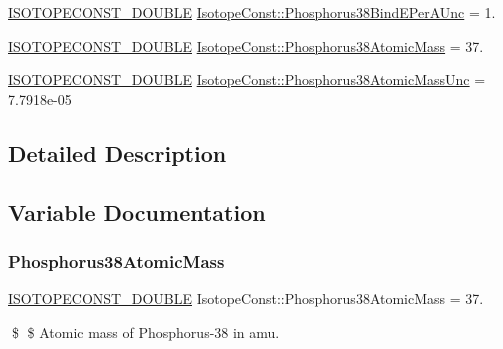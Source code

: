 \begin{DoxyCompactItemize}
\mbox{\hyperlink{group___isotope_const-_macros_ga8f45a7272ce02c0b4c65c44636ed719a}{I\+S\+O\+T\+O\+P\+E\+C\+O\+N\+S\+T\+\_\+\+D\+O\+U\+B\+LE}} \mbox{\hyperlink{group___isotope_const-_phosphorus-_p38_ga1e56cc3b4659a030aa91b6d56e541f2d}{Isotope\+Const\+::\+Phosphorus38\+Bind\+E\+Per\+A\+Unc}} = 1.
\item 
\mbox{\hyperlink{group___isotope_const-_macros_ga8f45a7272ce02c0b4c65c44636ed719a}{I\+S\+O\+T\+O\+P\+E\+C\+O\+N\+S\+T\+\_\+\+D\+O\+U\+B\+LE}} \mbox{\hyperlink{group___isotope_const-_phosphorus-_p38_gaf8de0927096c3c22b1b772d3cbffcc89}{Isotope\+Const\+::\+Phosphorus38\+Atomic\+Mass}} = 37.
\item 
\mbox{\hyperlink{group___isotope_const-_macros_ga8f45a7272ce02c0b4c65c44636ed719a}{I\+S\+O\+T\+O\+P\+E\+C\+O\+N\+S\+T\+\_\+\+D\+O\+U\+B\+LE}} \mbox{\hyperlink{group___isotope_const-_phosphorus-_p38_ga5da9348521f2e1e24bd2f993eeeab9fb}{Isotope\+Const\+::\+Phosphorus38\+Atomic\+Mass\+Unc}} = 7.\+7918e-\/05
\end{DoxyCompactItemize}


\subsection{Detailed Description}


\subsection{Variable Documentation}
\mbox{\label{group___isotope_const-_phosphorus-_p38_gaf8de0927096c3c22b1b772d3cbffcc89}} 
\subsubsection{\texorpdfstring{Phosphorus38\+Atomic\+Mass}{Phosphorus38AtomicMass}}
{\footnotesize\ttfamily \mbox{\hyperlink{group___isotope_const-_macros_ga8f45a7272ce02c0b4c65c44636ed719a}{I\+S\+O\+T\+O\+P\+E\+C\+O\+N\+S\+T\+\_\+\+D\+O\+U\+B\+LE}} Isotope\+Const\+::\+Phosphorus38\+Atomic\+Mass = 37.}

\$ \$ Atomic mass of Phosphorus-\/38 in amu. \mbox{\label{group___isotope_const-_phosphorus-_p38_ga5da9348521f2e1e24bd2f993eeeab9fb}} 
